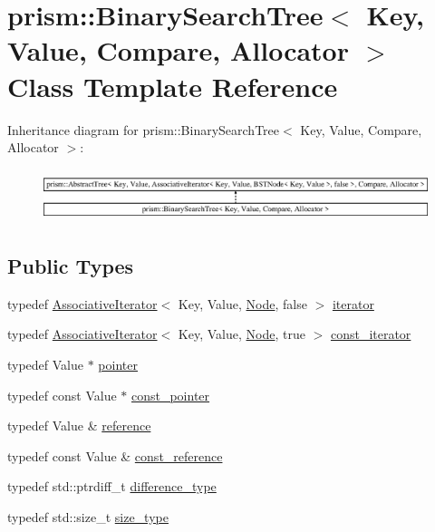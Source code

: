 \hypertarget{classprism_1_1_binary_search_tree}{}\section{prism\+:\+:Binary\+Search\+Tree$<$ Key, Value, Compare, Allocator $>$ Class Template Reference}
\label{classprism_1_1_binary_search_tree}
Inheritance diagram for prism\+:\+:Binary\+Search\+Tree$<$ Key, Value, Compare, Allocator $>$\+:\begin{figure}[H]
\begin{center}
\leavevmode
\includegraphics[height=1.544828cm]{classprism_1_1_binary_search_tree}
\end{center}
\end{figure}
\subsection*{Public Types}
\begin{DoxyCompactItemize}
\item 
typedef \hyperlink{structprism_1_1_associative_iterator}{Associative\+Iterator}$<$ Key, Value, \hyperlink{structprism_1_1_b_s_t_node}{Node}, false $>$ \hyperlink{classprism_1_1_binary_search_tree_a8c8deaa4e3617d5833c20970ffaa0348}{iterator}
\item 
typedef \hyperlink{structprism_1_1_associative_iterator}{Associative\+Iterator}$<$ Key, Value, \hyperlink{structprism_1_1_b_s_t_node}{Node}, true $>$ \hyperlink{classprism_1_1_binary_search_tree_ae72115785a3c50de35a62aa5ef102afd}{const\+\_\+iterator}
\item 
typedef Value $\ast$ \hyperlink{classprism_1_1_binary_search_tree_a159239eef3483ff85766b65e3cc8b36a}{pointer}
\item 
typedef const Value $\ast$ \hyperlink{classprism_1_1_binary_search_tree_a165bd59f5169479a5208e1c746943e2e}{const\+\_\+pointer}
\item 
typedef Value \& \hyperlink{classprism_1_1_binary_search_tree_ab924eeab8b8ce1edf77d02bceec9d4eb}{reference}
\item 
typedef const Value \& \hyperlink{classprism_1_1_binary_search_tree_aab75e547e4f5dd8e7f1518ec7b200937}{const\+\_\+reference}
\item 
typedef std\+::ptrdiff\+\_\+t \hyperlink{classprism_1_1_binary_search_tree_a9f97bb0b22c20eb1f8aff1719ad0e795}{difference\+\_\+type}
\item 
typedef std\+::size\+\_\+t \hyperlink{classprism_1_1_binary_search_tree_a757953cb7af54c9b07cf8a8a0fecb58f}{size\+\_\+type}
\end{DoxyCompactItemize}
